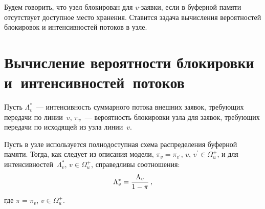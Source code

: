 \begin{multicols}{2}
   Будем говорить, что узел блокирован для $v$-за\-яв\-ки, если в буферной 
памяти отсутствует доступное место хранения. Ставится задача вычисления 
вероятностей блокировок и интенсивностей потоков в узле.

\section{Вычисление вероятности блокировки и~интенсивностей~потоков} 

   Пусть $\Lambda_v^*$~--- интенсивность суммарного потока внешних 
заявок, требующих передачи по линии~$v$, $\pi_v$~--- вероятность блокировки 
узла для заявок, требующих передачи по исходящей из узла линии~$v$. 

    Пусть в узле используется полнодоступная схема распределения 
буферной памяти. Тогда, как следует из описания модели, $\pi_v 
=\pi_{v^\prime},\,v,\,v^\prime\in \Omega_u^+$, и для 
интенсивностей~$\Lambda_v^*$, $v\in\Omega_u^+$, справедливы соотношения:
\begin{equation*}
\Lambda_v^* = \displaystyle\frac{\displaystyle \Lambda_v\mathstrut}{\displaystyle 1-\pi\mathstrut}\,,
\end{equation*}
    где
    $\pi =\pi_v$, $v\in\Omega_u^+$.


\end{multicols}

